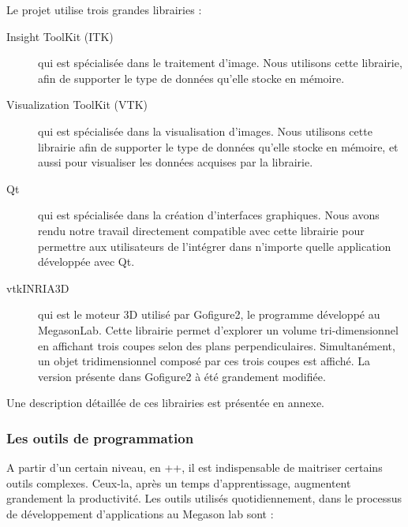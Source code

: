 Le projet utilise trois grandes librairies :
\begin{description}
  \item[Insight ToolKit (ITK)] qui est spécialisée dans le traitement d'image. Nous utilisons cette librairie, 
  afin de supporter le type de données qu'elle stocke en mémoire.
  \item[Visualization ToolKit (VTK)] qui est spécialisée dans la visualisation d'images. 
  Nous utilisons cette librairie afin de supporter le type de données qu'elle stocke en mémoire,
  et aussi pour visualiser les données acquises par la librairie.
  \item[Qt]\cite{refQT} qui est spécialisée dans la création d'interfaces graphiques. 
  Nous avons rendu notre travail directement compatible avec cette librairie
  pour permettre aux utilisateurs de l'intégrer dans n'importe quelle application développée avec Qt.
  \item[vtkINRIA3D]{\cite{vtkINRIA}} qui est le moteur 3D utilisé par Gofigure2\cite{refGofigure2},
  le programme développé au MegasonLab.
  Cette librairie permet d'explorer un volume tri-dimensionnel en affichant trois coupes selon des plans perpendiculaires.
  Simultanément, un objet tridimensionnel composé par ces trois coupes est affiché.
  La version présente dans Gofigure2 à été grandement modifiée.
\end{description}
Une description détaillée de ces librairies est présentée en annexe.


\subsubsection{Les outils de programmation}
A partir d'un certain niveau, en {\C++}, il est indispensable de maitriser certains outils complexes. Ceux-la, après un temps
 d'apprentissage, augmentent grandement la productivité.
Les outils utilisés quotidiennement, dans le processus de développement d'applications au Megason lab sont :

